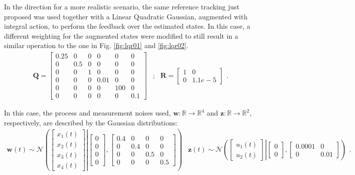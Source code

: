 \documentclass[a4paper,11pt]{book}
\numberwithin{figure}{chapter}
\numberwithin{equation}{chapter}
\numberwithin{table}{chapter}
\theoremstyle{definition}
\begin{document}
In the direction for a more realistic scenario, the same reference tracking just proposed was used together with a Linear Quadratic Gaussian, augmented with integral action, to perform the feedback over the estimated states. In this case, a different weighting for the augmented states were modified to still result in a similar operation to the one in Fig. \ref{fig:lqr01} and \ref{fig:lqr02}.
\begin{equation}
\begin{matrix}
   \bm{Q} = \begin{bmatrix} 0.25 & 0 & 0 & 0 & 0 & 0 \\ 0 & 0.5 & 0 & 0 & 0 & 0 \\ 0 & 0 & 1 & 0 & 0 & 0\\ 0 & 0 & 0 & 0.01 & 0 & 0 \\ 0 & 0 & 0 & 0 & 100 & 0 \\ 0 & 0 & 0 & 0 & 0 & 0.1 \end{bmatrix} &; & \bm{R} = \begin{bmatrix} 1 & 0 \\ 0 & 1.1e-5 \end{bmatrix}
\end{matrix}
.\end{equation} 

In this case, the process and measurement noises used, $\bm{w} : \mathbb{R} \rightarrow \mathbb{R}^{4}$ and $\bm{z} : \mathbb{R} \rightarrow \mathbb{R}^{2}$, respectively, are described by the Gaussian distributions:
\begin{equation}
\begin{matrix}
	\bm{w}(t) \sim \mathcal{N}\left( \left. \begin{bmatrix} x_1(t) \\ x_2(t) \\ x_3(t) \\ x_4(t) \end{bmatrix} \right| \begin{bmatrix} 0 \\ 0 \\ 0 \\ 0 \end{bmatrix}, \begin{bmatrix} 0.4 & 0 & 0 & 0 \\ 0 & 0.4 & 0 & 0 \\ 0 & 0 & 0.5 & 0 \\ 0 & 0 & 0 & 0.5 \end{bmatrix} \right) & 
\bm{z}(t) \sim \mathcal{N}\left( \left. \begin{bmatrix} u_1(t) \\ u_2(t) \end{bmatrix} \right| \begin{bmatrix} 0 \\ 0 \end{bmatrix}, \begin{bmatrix} 0.0001 & 0 \\ 0 & 0.01 \end{bmatrix} \right)
\end{matrix}
.\end{equation}
\end{document}
